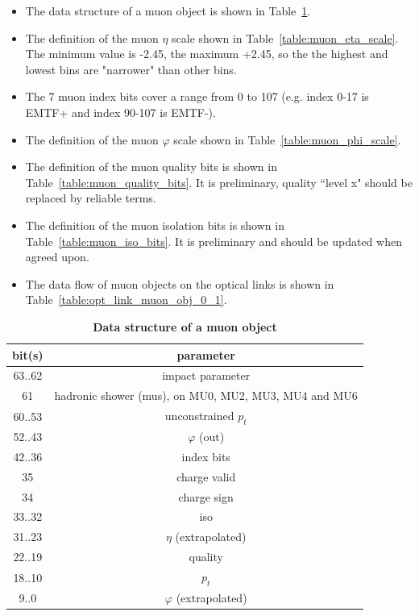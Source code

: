 \documentclass{cmspaper}
\begin{document}
\begin{itemize}
\item The data structure of a muon object is shown in Table~\ref{table:muon_object}.
\item The definition of the muon $\eta$ scale shown in Table~\ref{table:muon_eta_scale}. The minimum value is -2.45, the maximum +2.45, so the the highest and lowest
bins are "narrower" than other bins.
\item The 7 muon index bits cover a range from 0 to 107 (e.g. index 0-17 is EMTF+ and index 90-107 is EMTF-).
\item The definition of the muon $\varphi$ scale shown in Table~\ref{table:muon_phi_scale}.
\item The definition of the muon quality bits is shown in Table~\ref{table:muon_quality_bits}. It is preliminary, quality ``level x" should be replaced by reliable terms.
\item The definition of the muon isolation bits is shown in Table~\ref{table:muon_iso_bits}. It is preliminary and should be updated when agreed upon.
\item The data flow of muon objects on the optical links is shown in Table~\ref{table:opt_link_muon_obj_0_1}.
\end{itemize}

\begin{table}[ht]
\caption{\bf Data structure of a muon object}
\vspace{5mm}
\centering
\begin{tabular}{|c|c|}\hline
bit(s) & parameter \\\hline\hline
63..62 & impact parameter \\
61 & hadronic shower (mus), on MU0, MU2, MU3, MU4 and MU6 \\
60..53 & unconstrained $p_t$ \\
52..43 & $\varphi$ (out) \\
42..36 & index bits \\
35 & charge valid \\
34 & charge sign \\
33..32 & iso \\
31..23 & $\eta$ (extrapolated) \\
22..19 & quality \\
18..10 & $p_t$ \\
9..0 & $\varphi$ (extrapolated) \\\hline
\end{tabular}
\label{table:muon_object}
\end{table}
\end{document}
